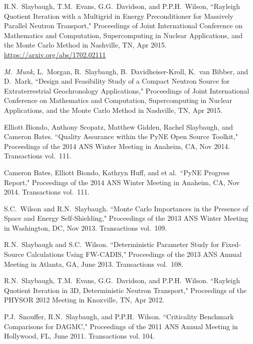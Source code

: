 \begin{bibsection}
\item  R.N.\ Slaybaugh, T.M.\ Evans, G.G.\ Davidson, and P.P.H.\ Wilson, ``Rayleigh Quotient Iteration with a Multigrid in Energy Preconditioner for Massively Parallel Neutron Transport," Proceedings of Joint International Conference on Mathematics and Computation, Supercomputing in Nuclear Applications, and the Monte Carlo Method in Nashville, TN, Apr 2015.\\
\url{https://arxiv.org/abs/1702.02111}

\item  \textit{M.\ Munk}, L.\ Morgan, R.\ Slaybaugh, B.\ Davidheiser-Kroll, K.\ van Bibber, and D.\ Mark, ``Design and Feasibility Study of a Compact Neutron Source for Extraterrestrial Geochronology Applications," Proceedings of Joint International Conference on Mathematics and Computation, Supercomputing in Nuclear Applications, and the Monte Carlo Method in Nashville, TN, Apr 2015.

\item Elliott Biondo, Anthony Scopatz, Matthew Gidden, Rachel Slaybaugh, and Cameron Bates. ``Quality Assurance within the PyNE Open Source Toolkit,"  Proceedings of the 2014 ANS Winter Meeting in Anaheim, CA, Nov 2014. Transactions vol.\ 111.

\item Cameron Bates, Elliott Biondo, Kathryn Huff, and et al.\ ``PyNE Progress Report," Proceedings of the 2014 ANS Winter Meeting in Anaheim, CA, Nov 2014. Transactions vol.\ 111.

\item S.C.\ Wilson and R.N.\ Slaybaugh. ``Monte Carlo Importances in the Presence of Space and Energy Self-Shielding," Proceedings of the 2013 ANS Winter Meeting in Washington, DC, Nov 2013. Transactions vol.\ 109.

\item R.N.\ Slaybaugh and  S.C.\ Wilson. ``Deterministic Parameter Study for Fixed-Source Calculations Using FW-CADIS," Proceedings of the 2013 ANS Annual Meeting in Atlanta, GA, June 2013. Transactions vol.\ 108.

\item R.N.\ Slaybaugh, T.M.\ Evans, G.G.\ Davidson, and P.P.H.\ Wilson. ``Rayleigh Quotient Iteration in 3D, Deterministic Neutron Transport," Proceedings of the PHYSOR 2012 Meeting in Knoxville, TN, Apr 2012.

\item P.J.\ Snouffer, R.N.\ Slaybaugh, and P.P.H.\ Wilson. ``Criticality Benchmark Comparisons for DAGMC," Proceedings of the 2011 ANS Annual Meeting in Hollywood, FL, June 2011. Transactions vol. 104.


\end{bibsection}
